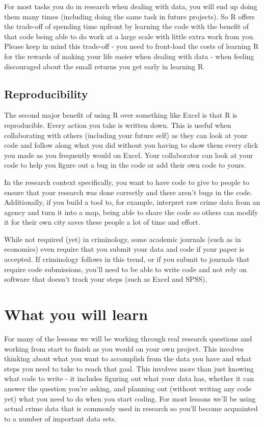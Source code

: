 \documentclass[
]{krantz}
\begin{document}
For most tasks you do in research when dealing with data,
you will end up doing them many times (including doing the
same task in future projects). So R offers the trade-off of
spending time upfront by learning the code with the benefit
of that code being able to do work at a large scale with
little extra work from you. Please keep in mind this
trade-off - you need to front-load the costs of learning R
for the rewards of making your life easier when dealing with
data - when feeling discouraged about the small returns you
get early in learning R.

\hypertarget{reproducibility}{%
\subsection*{Reproducibility}\label{reproducibility}}


The second major benefit of using R over something like
Excel is that R is reproducible. Every action you take is
written down. This is useful when collaborating with others
(including your future self) as they can look at your code
and follow along what you did without you having to show
them every click you made as you frequently would on Excel.
Your collaborator can look at your code to help you figure
out a bug in the code or add their own code to yours.

In the research context specifically, you want to have code
to give to people to ensure that your research was done
correctly and there aren't bugs in the code. Additionally,
if you build a tool to, for example, interpret raw crime
data from an agency and turn it into a map, being able to
share the code so others can modify it for their own city
saves these people a lot of time and effort.

While not required (yet) in criminology, some academic
journals (such as in economics) even require that you submit
your data and code if your paper is accepted. If criminology
follows in this trend, or if you submit to journals that
require code submissions, you'll need to be able to write
code and not rely on software that doesn't track your steps
(such as Excel and SPSS).

\hypertarget{what-you-will-learn}{%
\section*{What you will learn}\label{what-you-will-learn}}


For many of the lessons we will be working through real
research questions and working from start to finish as you
would on your own project. This involves thinking about what
you want to accomplish from the data you have and what steps
you need to take to reach that goal. This involves more than
just knowing what code to write - it includes figuring out
what your data has, whether it can answer the question
you're asking, and planning out (without writing any code
yet) what you need to do when you start coding. For most
lessons we'll be using actual crime data that is commonly
used in research so you'll become acquainted to a number of
important data sets.
\end{document}
